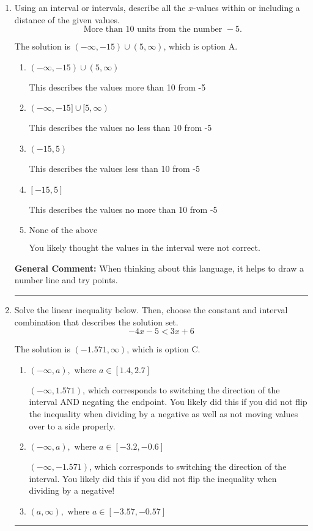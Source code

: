 \documentclass{extbook}[14pt]
\newcommand{\litem}[1]{\item #1

\rule{\textwidth}{0.4pt}}
\begin{document}
\begin{enumerate}\litem{
Using an interval or intervals, describe all the $x$-values within or including a distance of the given values.
\[ \text{ More than } 10 \text{ units from the number } -5. \]

The solution is \( (-\infty, -15) \cup (5, \infty) \), which is option A.\begin{enumerate}[label=\Alph*.]
\item \( (-\infty, -15) \cup (5, \infty) \)

This describes the values more than 10 from -5
\item \( (-\infty, -15] \cup [5, \infty) \)

This describes the values no less than 10 from -5
\item \( (-15, 5) \)

This describes the values less than 10 from -5
\item \( [-15, 5] \)

This describes the values no more than 10 from -5
\item \( \text{None of the above} \)

You likely thought the values in the interval were not correct.
\end{enumerate}

\textbf{General Comment:} When thinking about this language, it helps to draw a number line and try points.
}
\litem{
Solve the linear inequality below. Then, choose the constant and interval combination that describes the solution set.
\[ -4x -5 < 3x + 6 \]

The solution is \( (-1.571, \infty) \), which is option C.\begin{enumerate}[label=\Alph*.]
\item \( (-\infty, a), \text{ where } a \in [1.4, 2.7] \)

 $(-\infty, 1.571)$, which corresponds to switching the direction of the interval AND negating the endpoint. You likely did this if you did not flip the inequality when dividing by a negative as well as not moving values over to a side properly.
\item \( (-\infty, a), \text{ where } a \in [-3.2, -0.6] \)

 $(-\infty, -1.571)$, which corresponds to switching the direction of the interval. You likely did this if you did not flip the inequality when dividing by a negative!
\item \( (a, \infty), \text{ where } a \in [-3.57, -0.57] \)


\end{enumerate}}
\end{enumerate}
\end{document}
